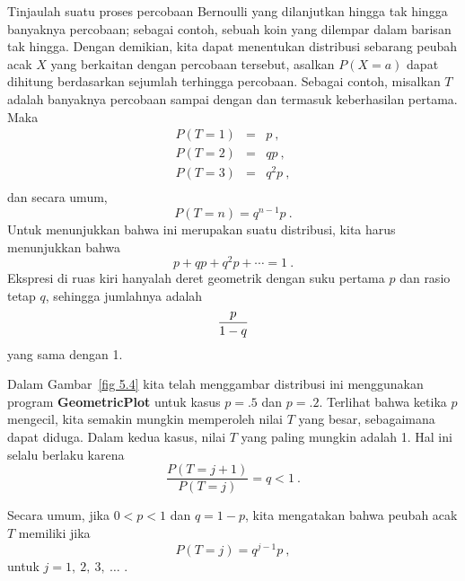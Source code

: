 Tinjaulah suatu proses percobaan Bernoulli yang dilanjutkan hingga tak hingga banyaknya
percobaan; sebagai contoh, sebuah koin yang dilempar dalam barisan tak hingga.
 Dengan demikian, kita dapat menentukan distribusi sebarang peubah acak $X$
yang berkaitan dengan percobaan tersebut, asalkan $P(X = a)$ dapat dihitung berdasarkan
sejumlah terhingga percobaan. Sebagai contoh, misalkan $T$ adalah banyaknya percobaan
sampai dengan dan termasuk keberhasilan pertama. Maka
\begin{eqnarray*} P(T = 1) & = & p\ , \\ P(T = 2) & = & qp\ , \\ P(T = 3) & = & q^2p\ , \\
\end{eqnarray*}
dan secara umum,
$$P(T = n) = q^{n-1}p\ .$$ 
Untuk menunjukkan bahwa ini merupakan suatu distribusi, kita harus menunjukkan bahwa
$$ p + qp + q^2p + \cdots = 1\ .
$$ 
Ekspresi di ruas kiri hanyalah deret geometrik dengan suku pertama $p$ dan rasio tetap
$q$, sehingga jumlahnya adalah
$${p\over{1-q}}$$ yang sama dengan 1.
\par Dalam Gambar~\ref{fig 5.4} kita telah menggambar distribusi ini menggunakan program
{\bf GeometricPlot} untuk kasus $p = .5$ dan $p = .2$. Terlihat bahwa ketika $p$
mengecil, kita semakin mungkin memperoleh nilai $T$ yang besar, sebagaimana dapat diduga.
Dalam kedua kasus, nilai $T$ yang paling mungkin adalah 1. Hal ini selalu berlaku karena
$$
\frac {P(T = j + 1)}{P(T = j)} = q < 1\ .
$$
\par
Secara umum, jika $0 < p < 1$ dan $q = 1 - p$, kita mengatakan bahwa peubah acak $T$
memiliki  jika
$$P(T = j) = q^{j - 1}p\ ,$$ untuk $j = 1,\ 2,\ 3,\ \ldots$ .

